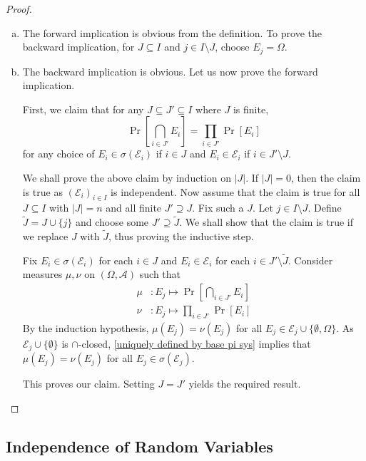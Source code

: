 \begin{proof}
    ~
    \begin{enumerate}[(a)]
        \item The forward implication is obvious from the definition. To prove the backward implication, for $J\subseteq I$ and $j\in I\setminus J$, choose $E_j=\Omega$.
        
        \item The backward implication is obvious. Let us now prove the forward implication.
        
        First, we claim that for any $J\subseteq J'\subseteq I$ where $J$ is finite, 
        $$\Pr\left[\bigcap_{i\in J'}E_i\right] = \prod_{i\in J'}\Pr[E_i]$$
        for any choice of $E_i\in\sigma(\mathcal{E}_i)$ if $i\in J$ and
        $E_i\in\mathcal{E}_i$ if $i\in J'\setminus J$.
        
        We shall prove the above claim by induction on $|J|$. If $|J|=0$, then the claim is true as $(\mathcal{E}_i)_{i\in I}$ is independent. Now assume that the claim is true for all $J\subseteq I$ with $|J|=n$ and all finite $J'\supseteq J$. Fix such a $J$. Let $j\in I\setminus J$. Define $\tilde J=J\cup\{j\}$ and choose some $J'\supseteq\tilde J$. We shall show that the claim is true if we replace $J$ with $\tilde J$, thus proving the inductive step.
    
        Fix $E_i\in\sigma(\mathcal{E}_i)$ for each $i\in J$ and $E_i\in\mathcal{E}_i$ for each $i\in J'\setminus\tilde J$. Consider measures $\mu,\nu$ on $(\Omega,\mathcal{A})$ such that
        \begin{align*}
            \mu &: E_j\mapsto \Pr\left[\bigcap_{i\in J'}E_i\right] \\
            \nu &: E_j\mapsto \prod_{i\in J'}\Pr[E_i]
        \end{align*}
        By the induction hypothesis, $\mu(E_j)=\nu(E_j)$ for all $E_j\in\mathcal{E}_j\cup\{\emptyset,\Omega\}$. As $\mathcal{E}_j\cup\{\emptyset\}$ is $\cap$-closed, \cref{uniquely defined by base pi sys} implies that $\mu(E_j)=\nu(E_j)$ for all $E_j\in\sigma(\mathcal{E}_j)$.
        
        This proves our claim. Setting $J=J'$ yields the required result.
    
    \end{enumerate}
\end{proof}

\subsection{Independence of Random Variables}

